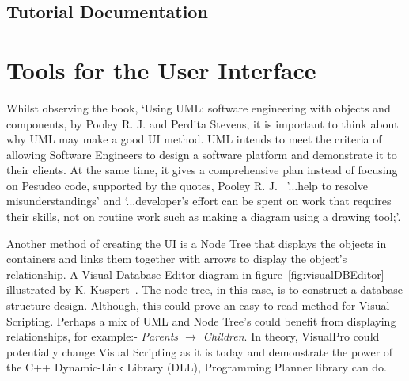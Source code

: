 \documentclass[12pt]{report} %
\begin{document}
		\subsection{Tutorial Documentation}
		

	\section{Tools for the User Interface}  
		Whilst observing the book, `Using UML: software engineering with objects and components, by Pooley R. J. and Perdita Stevens\cite{pooley_r_j_using_2006}, it is important to think about why UML may make a good UI method. UML intends to meet the criteria of allowing Software Engineers to design a software platform and demonstrate it to their clients. At the same time, it gives a comprehensive plan instead of focusing on Pesudeo code, supported by the quotes, Pooley R. J.~\cite{pooley_r_j_using_2006} '...help to resolve misunderstandings' and `...developer's effort can be spent on work that requires their skills, not on routine work such as making a diagram using a drawing tool;'.
		
		Another method of creating the UI is a Node Tree that displays the objects in containers and links them together with arrows to display the object's relationship. A Visual Database Editor diagram in figure~\ref{fig:visualDBEditor} illustrated by K. K${\ddot{u}}$spert~\cite{kuspert_design_1990}. The node tree, in this case, is to construct a database structure design. Although, this could prove an easy-to-read method for Visual Scripting. Perhaps a mix of UML and Node Tree's could benefit from displaying relationships, for example:- \textit{Parents ${\to}$ Children}. In theory, VisualPro could potentially change Visual Scripting as it is today and demonstrate the power of the C++ Dynamic-Link Library (DLL), Programming Planner library can do.
\end{document}
